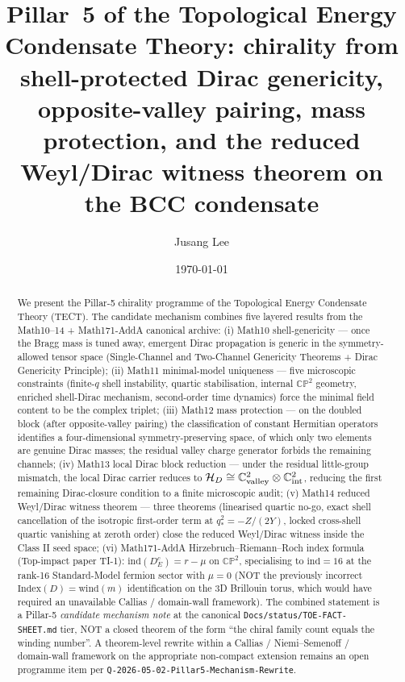 \title{Pillar~5 of the Topological Energy Condensate Theory:
chirality from shell-protected Dirac genericity, opposite-valley
pairing, mass protection, and the reduced Weyl/Dirac witness
theorem on the BCC condensate}

\author{Jusang Lee}

\date{\today}

\begin{abstract}
We present the Pillar-5 chirality programme of the Topological
Energy Condensate Theory (TECT). The candidate mechanism
combines five layered results from the Math10--14 + Math171-AddA
canonical archive:
(i) Math10 shell-genericity --- once the Bragg mass is tuned away,
emergent Dirac propagation is generic in the symmetry-allowed
tensor space (Single-Channel and Two-Channel Genericity Theorems +
Dirac Genericity Principle);
(ii) Math11 minimal-model uniqueness --- five microscopic
constraints (finite-$q$ shell instability, quartic stabilisation,
internal $\mathbb{CP}^2$ geometry, enriched shell-Dirac mechanism,
second-order time dynamics) force the minimal field content to be
the complex triplet;
(iii) Math12 mass protection --- on the doubled block (after
opposite-valley pairing) the classification of constant Hermitian
operators identifies a four-dimensional symmetry-preserving space,
of which only two elements are genuine Dirac masses; the residual
valley charge generator forbids the remaining channels;
(iv) Math13 local Dirac block reduction --- under the residual
little-group mismatch, the local Dirac carrier reduces to
$\mathcal{H}_D \cong \mathbb{C}^2_{\rm valley} \otimes \mathbb{C}^2_{\rm int}$,
reducing the first remaining Dirac-closure condition to a finite
microscopic audit;
(v) Math14 reduced Weyl/Dirac witness theorem --- three theorems
(linearised quartic no-go, exact shell cancellation of the
isotropic first-order term at $q_*^2 = -Z/(2Y)$, locked cross-shell
quartic vanishing at zeroth order) close the reduced Weyl/Dirac
witness inside the Class II seed space;
(vi) Math171-AddA Hirzebruch--Riemann--Roch index formula (Top-impact
paper TI-1): $\mathrm{ind}(D_E^c) = r - \mu$ on $\mathbb{CP}^2$,
specialising to $\mathrm{ind} = 16$ at the rank-16 Standard-Model
fermion sector with $\mu = 0$ (NOT the previously incorrect
$\mathrm{Index}(D) = \mathrm{wind}(m)$ identification on the 3D
Brillouin torus, which would have required an unavailable
Callias / domain-wall framework).
The combined statement is a Pillar-5 \emph{candidate mechanism note}
at the canonical \texttt{Docs/status/TOE-FACT-SHEET.md} tier, NOT a
closed theorem of the form ``the chiral family count equals the
winding number''. A theorem-level rewrite within a Callias /
Niemi--Semenoff / domain-wall framework on the appropriate
non-compact extension remains an open programme item per
\texttt{Q-2026-05-02-Pillar5-Mechanism-Rewrite}.
\end{abstract}


